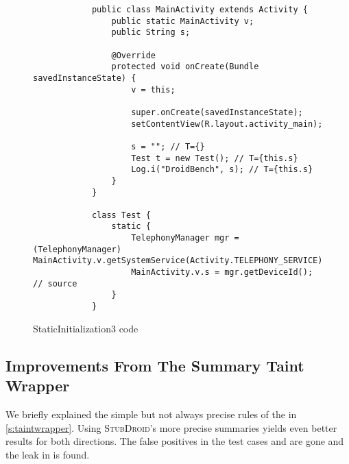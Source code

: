 \documentclass[../draft.tex]{subfiles}
\begin{document}
    \begin{figure}[ht]
        \begin{lstlisting}
            public class MainActivity extends Activity {
                public static MainActivity v;
                public String s;

                @Override
                protected void onCreate(Bundle savedInstanceState) {
                    v = this;
                
                    super.onCreate(savedInstanceState);
                    setContentView(R.layout.activity_main);
                
                    s = ""; // T={}
                    Test t = new Test(); // T={this.s}
                    Log.i("DroidBench", s); // T={this.s}
                }
            }

            class Test {
                static {
                    TelephonyManager mgr = (TelephonyManager) MainActivity.v.getSystemService(Activity.TELEPHONY_SERVICE);
                    MainActivity.v.s = mgr.getDeviceId(); // source
                }    
            }
        \end{lstlisting}
        \caption{StaticInitialization3 code}
        \label{lst:staticinit3}
    \end{figure}

    \subsection{Improvements From The Summary Taint Wrapper}
    We briefly explained the simple but not always precise rules of the  in \autoref{s:taintwrapper}. Using \textsc{StubDroid}'s more precise summaries yields even better results for both directions. The false positives in the test cases  and  are gone and the leak in  is found. 
\end{document}
